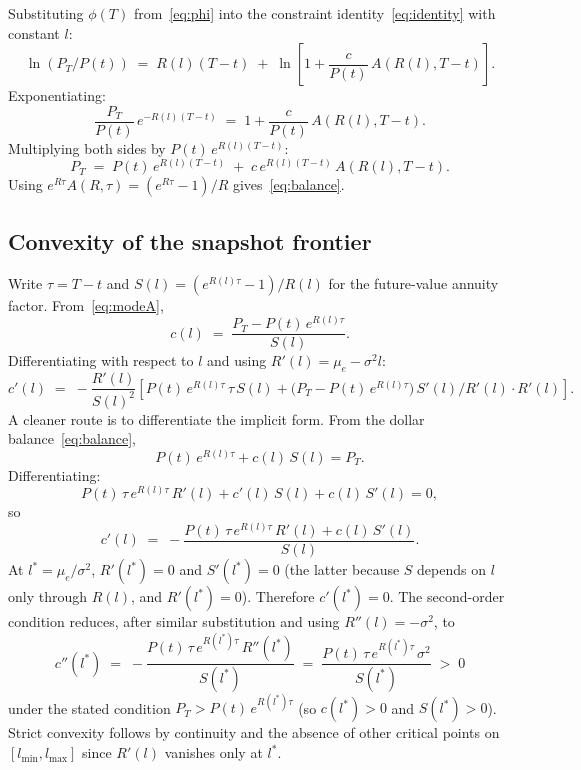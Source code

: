 \documentclass[11pt]{article}
\begin{document}
Substituting $\phi(T)$ from~\eqref{eq:phi} into the constraint
identity~\eqref{eq:identity} with constant $l$:
\begin{equation}
  \ln(P_T/P(t)) \;=\; R(l)(T - t) \;+\; \ln\!\left[1 + \frac{c}{P(t)}\,A(R(l), T - t)\right].
\end{equation}
Exponentiating:
\begin{equation}
  \frac{P_T}{P(t)}\, e^{-R(l)(T - t)} \;=\; 1 + \frac{c}{P(t)}\, A(R(l), T - t).
\end{equation}
Multiplying both sides by $P(t)\,e^{R(l)(T - t)}$:
\begin{equation}
  P_T \;=\; P(t)\, e^{R(l)(T - t)} \;+\; c\, e^{R(l)(T - t)}\, A(R(l), T - t).
\end{equation}
Using $e^{R\tau} A(R, \tau) = (e^{R\tau} - 1)/R$ gives~\eqref{eq:balance}.


\subsection{Convexity of the snapshot frontier}
\label{app:convex}

Write $\tau = T - t$ and $S(l) = (e^{R(l)\tau} - 1)/R(l)$ for the
future-value annuity factor. From~\eqref{eq:modeA},
\begin{equation}
  c(l) \;=\; \frac{P_T - P(t)\,e^{R(l)\tau}}{S(l)}.
\end{equation}
Differentiating with respect to $l$ and using $R'(l) = \mu_e -
\sigma^2 l$:
\begin{equation}
  c'(l) \;=\; -\frac{R'(l)}{S(l)^2}
  \left[P(t)\,e^{R(l)\tau}\,\tau\,S(l)
        + \bigl(P_T - P(t)\,e^{R(l)\tau}\bigr)\,S'(l) / R'(l) \cdot R'(l)\right].
\end{equation}
A cleaner route is to differentiate the implicit form. From the
dollar balance~\eqref{eq:balance},
\begin{equation}
  P(t)\, e^{R(l)\tau} + c(l)\, S(l) = P_T.
\end{equation}
Differentiating:
\begin{equation}
  P(t)\,\tau\, e^{R(l)\tau}\, R'(l) + c'(l)\, S(l) + c(l)\, S'(l) = 0,
\end{equation}
so
\begin{equation}
  c'(l) \;=\; -\frac{P(t)\,\tau\, e^{R(l)\tau}\, R'(l) + c(l)\, S'(l)}{S(l)}.
\end{equation}
At $l^* = \mu_e/\sigma^2$, $R'(l^*) = 0$ and $S'(l^*) = 0$ (the latter
because $S$ depends on $l$ only through $R(l)$, and $R'(l^*) = 0$).
Therefore $c'(l^*) = 0$. The second-order condition reduces, after
similar substitution and using $R''(l) = -\sigma^2$, to
\begin{equation}
  c''(l^*) \;=\; -\frac{P(t)\,\tau\, e^{R(l^*)\tau}\, R''(l^*)}{S(l^*)}
  \;=\; \frac{P(t)\,\tau\, e^{R(l^*)\tau}\, \sigma^2}{S(l^*)} \;>\; 0
\end{equation}
under the stated condition $P_T > P(t)\,e^{R(l^*)\tau}$ (so $c(l^*) >
0$ and $S(l^*) > 0$). Strict convexity follows by continuity and the
absence of other critical points on $[l_{\min}, l_{\max}]$ since
$R'(l)$ vanishes only at $l^*$.
\end{document}
